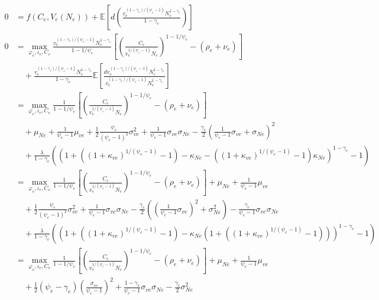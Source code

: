 \documentclass[12 pt, oneside]{article}
\theoremstyle{definition}
\theoremstyle{definition}
\theoremstyle{definition}
\newcommand{\E}{\mathbb{E}}
\begin{document}
\begin{align*}
  0 & = f(C_e, V_e(N_e)) + \E\left[d\left(\frac{v_e^{(1 - \gamma_e) / (\psi_e - 1)}N_e^{1 - \gamma_e}}{1 - \gamma_e}\right)\right]\\
  0 & = \max_{\varphi_e, \iota_e, C_e}  \frac{v_e^{(1 - \gamma_e) / (\psi_e - 1)} N_e^{ 1- \gamma_e}}{1 - 1/\psi_e}\left[\left(\frac{C_e}{v_e^{1 / (\psi_e - 1)}N_e  }\right)^{1 - 1 / \psi_e} - (\rho_e + \nu_e)\right]\\
    &\quad + \frac{v_e^{(1 - \gamma_e) / (\psi_e - 1)}N_e^{ 1 - \gamma_e}}{1 - \gamma_e}\E\left[\frac{dv_e^{(1 - \gamma_e) / (\psi_e - 1)}N_e^{1 - \gamma_e}}{v_e^{(1 - \gamma_e) / (\psi_e - 1)}N_e^{1 - \gamma_e}}\right]\\
    & = \max_{\varphi_e, \iota_e, C_e}  \frac{1}{1 - 1/\psi_e}\left[\left(\frac{C_e}{v_e^{1 / (\psi_e - 1)}N_e  }\right)^{1 - 1 / \psi_e} - (\rho_e + \nu_e)\right]\\
& \quad +   \mu_{Ne} + \frac{1}{\psi_e - 1}\mu_{ve} + \frac{1}{2}\frac{\psi_e}{(\psi_e - 1)^2}\sigma_{ve}^2 + \frac{1}{\psi_e - 1}\sigma_{ve}\sigma_{Ne} - \frac{\gamma_e}{2} \left(\frac{1}{\psi_e - 1}\sigma_{ve} + \sigma_{Ne}\right)^2\\
                                          &\quad + \frac{\lambda}{1 - \gamma_e}((1 +  ((1 + \kappa_{ve})^{1 / (\psi_e - 1)} - 1) - \kappa_{Ne} - ((1 + \kappa_{ve})^{1 / (\psi_e - 1)} - 1)\kappa_{Ne})^{1 - \gamma_e} - 1)\\
    & = \max_{\varphi_e, \iota_e, C_e}  \frac{1}{1 - 1/\psi_e}\left[\left(\frac{C_e}{v_e^{1 / (\psi_e - 1)}N_e  }\right)^{1 - 1 / \psi_e} - (\rho_e + \nu_e)\right]+  \mu_{Ne} + \frac{1}{\psi_e - 1}\mu_{ve} \\
& \quad + \frac{1}{2}\frac{\psi_e}{(\psi_e - 1)^2}\sigma_{ve}^2  + \frac{1}{\psi_e - 1}\sigma_{ve}\sigma_{Ne} - \frac{\gamma_e}{2}\left( \left(\frac{1}{\psi_e - 1}\sigma_{ve}\right)^2 + \sigma_{Ne}^2\right) - \frac{\gamma_e}{\psi_e - 1}\sigma_{ve}\sigma_{Ne}\\
                                          &\quad + \frac{\lambda}{1 - \gamma_e}((1 +  ((1 + \kappa_{ve})^{1 / (\psi_e - 1)} - 1) - \kappa_{Ne}(1  + ((1 + \kappa_{ve})^{1 / (\psi_e - 1)} - 1)))^{1 - \gamma_e} - 1)\\
    & = \max_{\varphi_e, \iota_e, C_e}  \frac{1}{1 - 1/\psi_e}\left[\left(\frac{C_e}{v_e^{1 / (\psi_e - 1)}N_e  }\right)^{1 - 1 / \psi_e} - (\rho_e + \nu_e)\right]+  \mu_{Ne} + \frac{1}{\psi_e - 1}\mu_{ve} \\
& \quad + \frac{1}{2}(\psi_e - \gamma_e)\left(\frac{\sigma_{ve}}{\psi_e - 1}\right)^2   + \frac{1 - \gamma_e}{\psi_e - 1}\sigma_{ve}\sigma_{Ne} - \frac{\gamma_e}{2} \sigma_{Ne}^2 \\

\end{align*}
\end{document}
